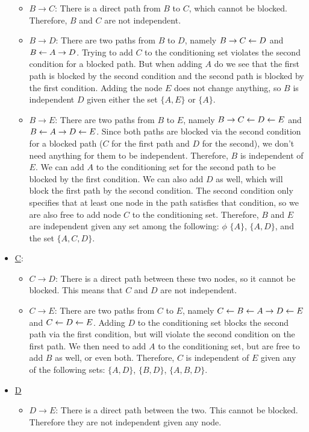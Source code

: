 \begin{solution}
\begin{itemize}
        \begin{itemize}
            \item \underline{$B \to C$}: There is a direct path from $B$ to $C$, which cannot be blocked. Therefore, $B$ and $C$ are not independent. 
            \item \underline{$B \to D$}: There are two paths from $B$ to $D$, namely $B \to C \leftarrow D$ and $B \leftarrow A \to D$. Trying to add $C$ to the conditioning set violates the second condition for a blocked path. But when adding $A$ do we see that the first path is blocked by the second condition and the second path is blocked by the first condition. Adding the node $E$ does not change anything, so $B$ is independent $D$ given either the set $\{A, E\}$ or $\{A\}$.
            \item \underline{$B \to E$}: There are two paths from $B$ to $E$, namely $B \to C \leftarrow D \leftarrow E$ and $B \leftarrow A \to D \leftarrow E$. Since both paths are blocked via the second condition for a blocked path ($C$ for the first path and $D$ for the second), we don't need anything for them to be independent. Therefore, $B$ is independent of $E$. We can add $A$ to the conditioning set for the second path to be blocked by the first condition. We can also add $D$ as well, which will block the first path by the second condition. The second condition only specifies that at least one node in the path satisfies that condition, so we are also free to add node $C$ to the conditioning set. Therefore, $B$ and $E$ are independent given any set among the following: $\phi$ $ \{A\}$, $\{A, D\}$, and the set $\{A, C, D\}$.  
        \end{itemize}
        \item  \underline{C}:
        \begin{itemize}
            \item \underline{$C \to D$}: There is a direct path between these two nodes, so it cannot be blocked. This means that $C$ and $D$ are not independent. 
            \item \underline{$C \to E$}: There are two paths from $C$ to $E$, namely $C \leftarrow B \leftarrow A \to D \leftarrow E$ and $C \leftarrow D \leftarrow E$. Adding $D$ to the conditioning set blocks the second path via the first condition, but will violate the second condition on the first path. We then need to add $A$ to the conditioning set, but are free to add $B$ as well, or even both. Therefore, $C$ is independent of $E$ given any of the following sets: $\{A, D\}$, $\{B, D\}$, $\{A, B, D\}$. 
        \end{itemize}
        \item \underline{D}
        \begin{itemize}
            \item \underline{$D \to E$}: There is a direct path between the two. This cannot be blocked. Therefore they are not independent given any node. 
        \end{itemize}
    \end{itemize}
\end{solution}


